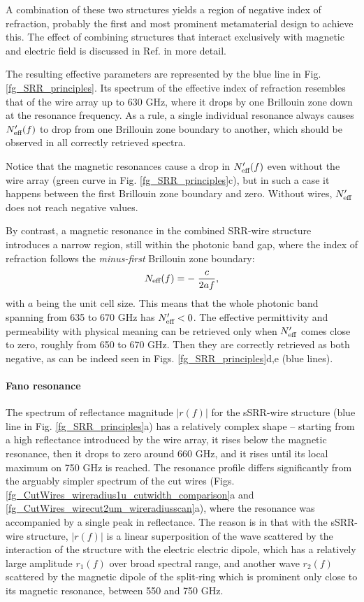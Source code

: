 A combination of these two structures yields a region of negative index of refraction, probably the first \cite{pendry2000negative} and most prominent metamaterial design to achieve this. The effect of combining structures that interact exclusively with magnetic and electric field is discussed in Ref. \cite{koschny2004effective} in more detail.

The resulting effective parameters are represented by the blue line in Fig. \ref{fg_SRR_principles}. Its spectrum of the effective index of refraction resembles that of the wire array up to 630 GHz, where it drops by one Brillouin zone down at the resonance frequency.
As a rule, a single individual resonance always causes $N_{\text{eff} }'(f)$ to drop from one Brillouin zone boundary to another, which should be observed in all correctly retrieved spectra. 

Notice that the magnetic resonances cause a drop in $N_{\text{eff} }'(f)$ even without the wire array (green curve in Fig. \ref{fg_SRR_principles}c), but in such a case it happens between the first Brillouin zone boundary and zero. Without wires, $N_{\text{eff} }'$ does not reach negative values.

By contrast, a magnetic resonance in the combined SRR-wire structure introduces a narrow region, still within the photonic band gap, where the index of refraction follows the \textit{minus-first} Brillouin zone boundary:
\begin{equation} N_{\text{eff} }(f) = -\;\frac{c}{2 a f}, \label{eq_BZN2}\end{equation}
with $a$ being the unit cell size. This means that the whole photonic band spanning from 635 to 670 GHz has $N_{\text{eff} }'<0$. The effective permittivity and permeability with physical meaning can be retrieved only when $N_{\text{eff} }'$ comes close to zero, roughly from 650 to 670 GHz. Then they are correctly retrieved as both negative, as can be indeed seen in Figs. \ref{fg_SRR_principles}d,e (blue lines).

\paragraph{Fano resonance} %
The spectrum of reflectance magnitude $|r(f)|$ for the sSRR-wire structure (blue line in Fig. \ref{fg_SRR_principles}a) has a relatively complex shape -- starting from a high reflectance introduced by the wire array, it rises below the magnetic resonance, then it drops to zero around 660 GHz, and it rises until its local maximum on 750 GHz is reached.
The resonance profile differs significantly from the arguably simpler spectrum of the cut wires (Figs. \ref{fg_CutWires_wireradius1u_cutwidth_comparison}a and \ref{fg_CutWires_wirecut2um_wireradiusscan}a), where the resonance was accompanied by a single peak in reflectance. 
The reason is in that with the sSRR-wire structure, $|r(f)|$ is a linear superposition of the wave scattered by the interaction of the structure with the electric electric dipole, which has a relatively large amplitude $r_{1}(f)$ over broad spectral range, and another wave $r_{2}(f)$ scattered by the magnetic dipole of the split-ring which is prominent only close to its magnetic resonance, between 550 and 750 GHz.

